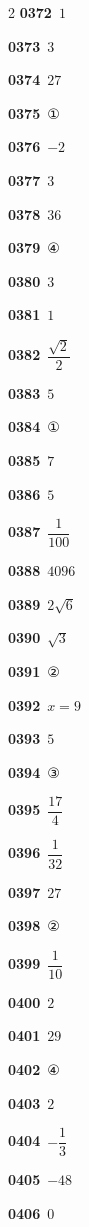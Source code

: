 \documentclass[10pt,a4paper]{article}
\begin{document}
\begin{multicols}{2}
\noindent\textbf{0372}\ $1$\par
\noindent\textbf{0373}\ $3$\par
\noindent\textbf{0374}\ $27$\par
\noindent\textbf{0375}\ ①\par
\noindent\textbf{0376}\ $-2$\par
\noindent\textbf{0377}\ $3$\par
\noindent\textbf{0378}\ $36$\par
\noindent\textbf{0379}\ ④\par
\noindent\textbf{0380}\ $3$\par
\noindent\textbf{0381}\ $1$\par
\noindent\textbf{0382}\ $\dfrac{\sqrt{2}}{2}$\par
\noindent\textbf{0383}\ $5$\par
\noindent\textbf{0384}\ ①\par
\noindent\textbf{0385}\ $7$\par
\noindent\textbf{0386}\ $5$\par
\noindent\textbf{0387}\ $\dfrac{1}{100}$\par
\noindent\textbf{0388}\ $4096$\par
\noindent\textbf{0389}\ $2\sqrt{6}$\par
\noindent\textbf{0390}\ $\sqrt{3}$\par
\noindent\textbf{0391}\ ②\par
\noindent\textbf{0392}\ $x=9$\par
\noindent\textbf{0393}\ $5$\par
\noindent\textbf{0394}\ ③\par
\noindent\textbf{0395}\ $\dfrac{17}{4}$\par
\noindent\textbf{0396}\ $\dfrac{1}{32}$\par
\noindent\textbf{0397}\ $27$\par
\noindent\textbf{0398}\ ②\par
\noindent\textbf{0399}\ $\dfrac{1}{10}$\par
\noindent\textbf{0400}\ $2$\par
\noindent\textbf{0401}\ $29$\par
\noindent\textbf{0402}\ ④\par
\noindent\textbf{0403}\ $2$\par
\noindent\textbf{0404}\ $-\dfrac{1}{3}$\par
\noindent\textbf{0405}\ $-48$\par
\noindent\textbf{0406}\ $0$\par

\end{multicols}
\end{document}
